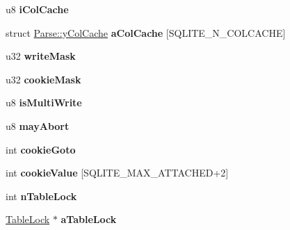 \begin{DoxyCompactItemize}
\item 
\hypertarget{struct_parse_a619672481a55a6e31bc03c00d1d6954c}{u8 {\bfseries i\-Col\-Cache}}\label{struct_parse_a619672481a55a6e31bc03c00d1d6954c}

\item 
\hypertarget{struct_parse_a788b85979d58b84e06bc367bac5b3f3f}{struct \hyperlink{struct_parse_1_1y_col_cache}{Parse\-::y\-Col\-Cache} {\bfseries a\-Col\-Cache} \mbox{[}S\-Q\-L\-I\-T\-E\-\_\-\-N\-\_\-\-C\-O\-L\-C\-A\-C\-H\-E\mbox{]}}\label{struct_parse_a788b85979d58b84e06bc367bac5b3f3f}

\item 
\hypertarget{struct_parse_a026177f2db1edd3fe2ca69ef683ebb75}{u32 {\bfseries write\-Mask}}\label{struct_parse_a026177f2db1edd3fe2ca69ef683ebb75}

\item 
\hypertarget{struct_parse_aed208e9a47fbcf93b91aa08ef9ff90e7}{u32 {\bfseries cookie\-Mask}}\label{struct_parse_aed208e9a47fbcf93b91aa08ef9ff90e7}

\item 
\hypertarget{struct_parse_a027d06007eab8e01b8930357f321344b}{u8 {\bfseries is\-Multi\-Write}}\label{struct_parse_a027d06007eab8e01b8930357f321344b}

\item 
\hypertarget{struct_parse_a1813c80797fcdba29e95813284619e57}{u8 {\bfseries may\-Abort}}\label{struct_parse_a1813c80797fcdba29e95813284619e57}

\item 
\hypertarget{struct_parse_a38a03495b8b18e86c2855c70b717d921}{int {\bfseries cookie\-Goto}}\label{struct_parse_a38a03495b8b18e86c2855c70b717d921}

\item 
\hypertarget{struct_parse_a6023169734f87ce27a760e0f9026c381}{int {\bfseries cookie\-Value} \mbox{[}S\-Q\-L\-I\-T\-E\-\_\-\-M\-A\-X\-\_\-\-A\-T\-T\-A\-C\-H\-E\-D+2\mbox{]}}\label{struct_parse_a6023169734f87ce27a760e0f9026c381}

\item 
\hypertarget{struct_parse_a8c61b1b13dcb394b190fa09f5c253928}{int {\bfseries n\-Table\-Lock}}\label{struct_parse_a8c61b1b13dcb394b190fa09f5c253928}

\item 
\hypertarget{struct_parse_ae8e553d660dc69d285945d3db8f127c7}{\hyperlink{struct_table_lock}{Table\-Lock} $\ast$ {\bfseries a\-Table\-Lock}}\label{struct_parse_ae8e553d660dc69d285945d3db8f127c7}


\end{DoxyCompactItemize}
